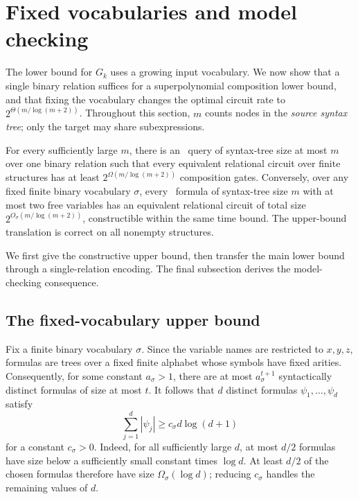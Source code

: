 \section{Fixed vocabularies and model checking}\label{sec:fixed-vocabulary}
The lower bound for $G_k$ uses a growing input vocabulary. We now show
that a single binary relation suffices for a superpolynomial composition
lower bound, and that fixing the vocabulary changes the optimal circuit
rate to $2^{\Theta(m/\log(m+2))}$. Throughout this section, $m$ counts
nodes in the \emph{source syntax tree}; only the target may share
subexpressions.

\begin{theorem}
\label{thm:fixed-vocabulary:formal}
For every sufficiently large $m$, there is an \FOthree\ query of
syntax-tree size at most $m$ over one binary relation such that every
equivalent relational circuit over finite structures has at least
$2^{\Omega(m/\log(m+2))}$ composition gates.
Conversely, over any fixed finite binary vocabulary $\sigma$, every
\FOthree\ formula of syntax-tree size $m$ with at most two free variables
has an equivalent relational circuit of total size
$2^{O_\sigma(m/\log(m+2))}$, constructible within the same time bound.
The upper-bound translation is correct on all nonempty structures.
\end{theorem}

We first give the constructive upper bound, then transfer the main
lower bound through a single-relation encoding. The final subsection
derives the model-checking consequence.

\subsection{The fixed-vocabulary upper bound}\label{sec:fixed-upper}
Fix a finite binary vocabulary $\sigma$. Since the variable names
are restricted to $x,y,z$, formulas are trees over a fixed finite
alphabet whose symbols have fixed arities. Consequently, for some constant $a_\sigma>1$, there
are at most $a_\sigma^{t+1}$ syntactically distinct formulas of size
at most $t$. It follows that $d$ distinct formulas
$\psi_1,\ldots,\psi_d$ satisfy
\[
 \sum_{j=1}^d|\psi_j|
 \ge c_\sigma d\log(d+1)
\]
for a constant $c_\sigma>0$.
Indeed, for all sufficiently large $d$, at most $d/2$ formulas have
size below a sufficiently small constant times $\log d$.
At least $d/2$ of the chosen formulas therefore have size
$\Omega_\sigma(\log d)$; reducing $c_\sigma$ handles the remaining
values of $d$.

